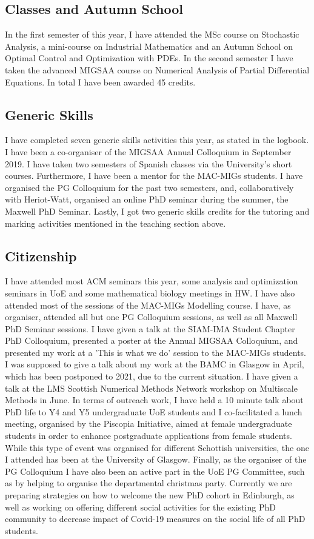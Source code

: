 \documentclass[11pt, a4paper]{article}
\theoremstyle{definition}
\begin{document}
\subsection{Classes and Autumn School}
In the first semester of this year, I have attended the MSc course on Stochastic Analysis, a mini-course on Industrial Mathematics and an Autumn School on Optimal Control and Optimization with PDEs. In the second semester I have taken the advanced MIGSAA course on Numerical Analysis of Partial Differential Equations. In total I have been awarded 45 credits.
\subsection{Generic Skills}
I have completed seven generic skills activities this year, as stated in the logbook. I have been a co-organiser of the MIGSAA Annual Colloquium in September 2019. I have taken two semesters of Spanish classes via the University's short courses. Furthermore, I have been a mentor for the MAC-MIGs students. I have organised the PG Colloquium for the past two semesters, and, collaboratively with Heriot-Watt, organised an online PhD seminar during the summer, the Maxwell PhD Seminar.
Lastly, I got two generic skills credits for the tutoring and marking activities mentioned in the teaching section above.
\subsection{Citizenship}
I have attended most ACM seminars this year, some analysis and optimization seminars in UoE and some mathematical biology meetings in HW. I have also attended most of the sessions of the MAC-MIGs Modelling course. I have, as organiser, attended all but one PG Colloquium sessions, as well as all Maxwell PhD Seminar sessions.
I have given a talk at the SIAM-IMA Student Chapter PhD Colloquium, presented a poster at the Annual MIGSAA Colloquium, and presented my work at a 'This is what we do' session to the MAC-MIGs students. I was supposed to give a talk about my work at the BAMC in Glasgow in April, which has been postponed to 2021, due to the current situation. I have given a talk at the LMS Scottish Numerical Methods Network workshop on Multiscale Methods in June. In terms of outreach work, I have held a 10 minute talk about PhD life to Y4 and Y5 undergraduate UoE students and I co-facilitated a lunch meeting, organised by the Piscopia Initiative, aimed at female undergraduate students in order to enhance postgraduate applications from female students. While this type of event was organised for different Schottish universities, the one I attended has been at the University of Glasgow.
Finally, as the organiser of the PG Colloquium I have also been an active part in the UoE PG Committee, such as by helping to organise the departmental christmas party. Currently we are preparing strategies on how to welcome the new PhD cohort in Edinburgh, as well as working on offering different social activities for the existing PhD community to decrease impact of Covid-19 measures on the social life of all PhD students.
\end{document}
